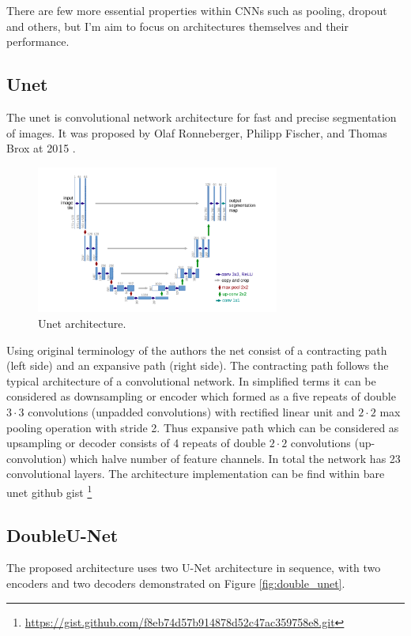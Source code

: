 There are few more essential properties within CNNs such as pooling, dropout and others, but I'm aim to focus on architectures themselves and their performance. 

\subsection{Unet}
The unet is convolutional network architecture for fast and precise segmentation of images. It was proposed by Olaf Ronneberger, Philipp Fischer, and Thomas Brox at 2015 \cite{Ronneberger2015}. 

\begin{figure}[h]
    \centering \includegraphics[width=8cm]{images/unet.png}
    \caption {Unet architecture.}
\end{figure}

Using original terminology of the authors \cite{Ronneberger2015} the net consist of a contracting path (left side) and an expansive path (right side). The contracting path follows the typical architecture of a convolutional network. In simplified terms it can be considered as downsampling or encoder which formed as
a five repeats of double $3 \cdot 3$ convolutions (unpadded convolutions) with rectified linear unit and $2 \cdot 2$ max pooling operation with stride 2. Thus expansive path which can be considered as upsampling or decoder consists of 4 repeats of double $2 \cdot 2$ convolutions (up-convolution) which halve number of feature channels. In total the network has 23 convolutional layers. The architecture implementation can be find within bare unet github gist \footnote { \url{https://gist.github.com/f8eb74d57b914878d52c47ac359758e8.git}}

\subsection{DoubleU-Net}
The proposed architecture uses two U-Net architecture in sequence, with two encoders and two decoders demonstrated on Figure \ref{fig:double_unet}.

